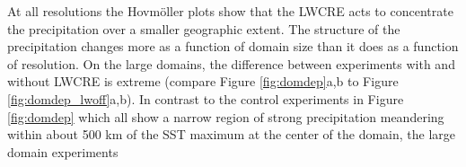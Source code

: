 \documentclass[draft]{agujournal2019}
\begin{document}
At all resolutions the Hovm{\"o}ller plots show that the LWCRE acts to concentrate the precipitation over a smaller geographic extent.   
The structure of the precipitation changes more 
as a function of domain size than it does as a function of resolution. 
On the large domains, the difference between experiments with and without LWCRE is extreme (compare Figure \ref{fig:domdep}a,b to Figure \ref{fig:domdep_lwoff}a,b).  
In contrast to the control experiments in Figure \ref{fig:domdep} which all show a narrow region of strong 
precipitation meandering within about 500 km of the SST maximum at the center of the domain,  the large domain experiments 
\end{document}
